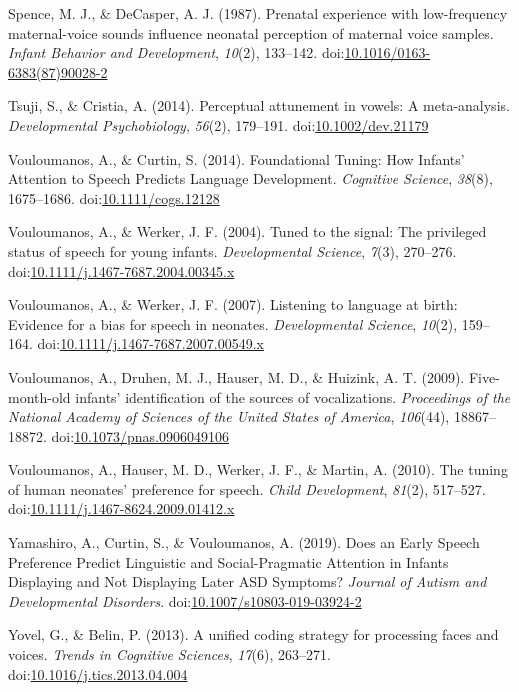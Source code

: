 \documentclass[man]{apa6}
\begin{document}
\hypertarget{ref-spence_prenatal_1987}{}
Spence, M. J., \& DeCasper, A. J. (1987). Prenatal experience with
low-frequency maternal-voice sounds influence neonatal perception of
maternal voice samples. \emph{Infant Behavior and Development},
\emph{10}(2), 133--142.
doi:\href{https://doi.org/10.1016/0163-6383(87)90028-2}{10.1016/0163-6383(87)90028-2}

\hypertarget{ref-tsuji_perceptual_2014}{}
Tsuji, S., \& Cristia, A. (2014). Perceptual attunement in vowels: A
meta-analysis. \emph{Developmental Psychobiology}, \emph{56}(2),
179--191.
doi:\href{https://doi.org/10.1002/dev.21179}{10.1002/dev.21179}

\hypertarget{ref-vouloumanos_foundational_2014}{}
Vouloumanos, A., \& Curtin, S. (2014). Foundational Tuning: How Infants'
Attention to Speech Predicts Language Development. \emph{Cognitive
Science}, \emph{38}(8), 1675--1686.
doi:\href{https://doi.org/10.1111/cogs.12128}{10.1111/cogs.12128}

\hypertarget{ref-vouloumanos_tuned_2004}{}
Vouloumanos, A., \& Werker, J. F. (2004). Tuned to the signal: The
privileged status of speech for young infants. \emph{Developmental
Science}, \emph{7}(3), 270--276.
doi:\href{https://doi.org/10.1111/j.1467-7687.2004.00345.x}{10.1111/j.1467-7687.2004.00345.x}

\hypertarget{ref-vouloumanos_listening_2007}{}
Vouloumanos, A., \& Werker, J. F. (2007). Listening to language at
birth: Evidence for a bias for speech in neonates. \emph{Developmental
Science}, \emph{10}(2), 159--164.
doi:\href{https://doi.org/10.1111/j.1467-7687.2007.00549.x}{10.1111/j.1467-7687.2007.00549.x}

\hypertarget{ref-vouloumanos_five-month-old_2009}{}
Vouloumanos, A., Druhen, M. J., Hauser, M. D., \& Huizink, A. T. (2009).
Five-month-old infants' identification of the sources of vocalizations.
\emph{Proceedings of the National Academy of Sciences of the United
States of America}, \emph{106}(44), 18867--18872.
doi:\href{https://doi.org/10.1073/pnas.0906049106}{10.1073/pnas.0906049106}

\hypertarget{ref-vouloumanos_tuning_2010}{}
Vouloumanos, A., Hauser, M. D., Werker, J. F., \& Martin, A. (2010). The
tuning of human neonates' preference for speech. \emph{Child
Development}, \emph{81}(2), 517--527.
doi:\href{https://doi.org/10.1111/j.1467-8624.2009.01412.x}{10.1111/j.1467-8624.2009.01412.x}

\hypertarget{ref-yamashiro_does_2019}{}
Yamashiro, A., Curtin, S., \& Vouloumanos, A. (2019). Does an Early
Speech Preference Predict Linguistic and Social-Pragmatic Attention in
Infants Displaying and Not Displaying Later ASD Symptoms? \emph{Journal
of Autism and Developmental Disorders}.
doi:\href{https://doi.org/10.1007/s10803-019-03924-2}{10.1007/s10803-019-03924-2}

\hypertarget{ref-yovel_unified_2013}{}
Yovel, G., \& Belin, P. (2013). A unified coding strategy for processing
faces and voices. \emph{Trends in Cognitive Sciences}, \emph{17}(6),
263--271.
doi:\href{https://doi.org/10.1016/j.tics.2013.04.004}{10.1016/j.tics.2013.04.004}

\endgroup
\end{document}
